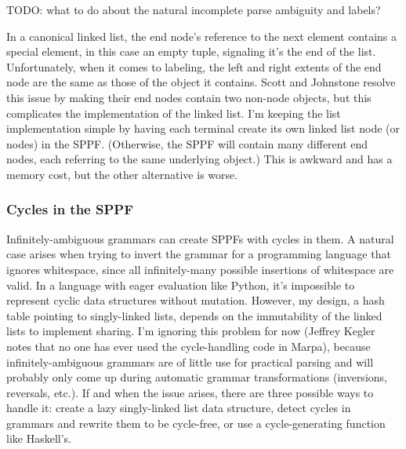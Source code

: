 \documentclass[12pt]{article}
\begin{document}
TODO: what to do about the natural incomplete parse ambiguity and
labels?

In a canonical linked list, the end node's reference to the next
element contains a special element, in this case an empty tuple,
signaling it's the end of the list.  Unfortunately, when it comes to
labeling, the left and right extents of the end node are the same as
those of the object it contains.  Scott and Johnstone resolve this
issue by making their end nodes contain two non-node objects, but this
complicates the implementation of the linked list.  I'm keeping the
list implementation simple by having each terminal create its own
linked list node (or nodes) in the SPPF.  (Otherwise, the SPPF will
contain many different end nodes, each referring to the same
underlying object.)  This is awkward and has a memory cost, but the
other alternative is worse.

\subsubsection{Cycles in the SPPF}
\label{sec:sppf_cycles}

Infinitely-ambiguous grammars can create SPPFs with cycles in them.  A
natural case arises when trying to invert the grammar for a
programming language that ignores whitespace, since all
infinitely-many possible insertions of whitespace are valid.  In a
language with eager evaluation like Python, it's impossible to
represent cyclic data structures without mutation.  However, my
design, a hash table pointing to singly-linked lists, depends on the
immutability of the linked lists to implement sharing.  I'm ignoring
this problem for now (Jeffrey Kegler notes that no one has ever used
the cycle-handling code in Marpa), because infinitely-ambiguous
grammars are of little use for practical parsing and will probably
only come up during automatic grammar transformations (inversions,
reversals, etc.).  If and when the issue arises, there are three
possible ways to handle it: create a lazy singly-linked list data
structure, detect cycles in grammars and rewrite them to be
cycle-free, or use a cycle-generating function like Haskell's.
\end{document}
